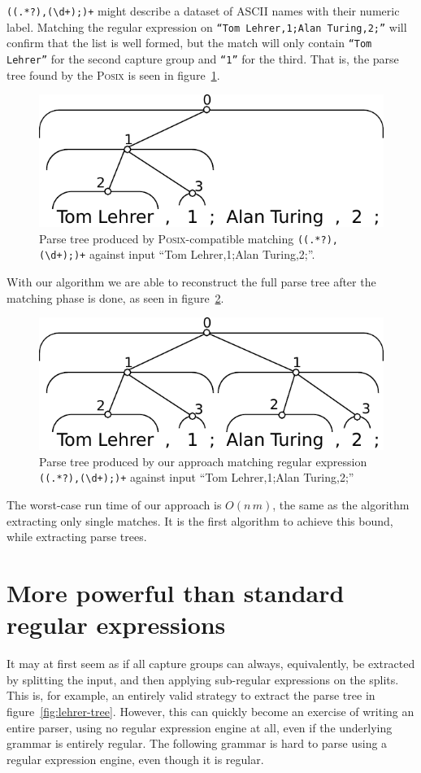 \documentclass[11pt]{Thesis}
\theoremstyle{definition}
\newcommand{\Figref}[1]{figure~\ref{fig:#1}}
\newcommand{\figlabel}[1]{\label{fig:#1}}
\newcommand{\seclabel}[1]{\label{sec:#1}}
\begin{document}
\texttt{((.*?),(\textbackslash d+);)+} might describe a dataset of ASCII names
with their numeric label. Matching the regular expression on \texttt{``Tom
Lehrer,1;Alan Turing,2;''} will confirm that the list is well formed, but the
match will only contain \texttt{``Tom Lehrer''} for the second capture group
and \texttt{``1''} for the third. That is, the parse tree found by the
\textsc{Posix} is seen in \Figref{posix}.

\begin{figure}[htp]
\centering
\includegraphics[width=.75\linewidth]{graphs/posix_parse}
\caption[Posix parse tree]{\figlabel{lehrer-posix} Parse tree produced by
\textsc{Posix}-compatible matching \texttt{((.*?),(\textbackslash d+);)+}
against input ``Tom Lehrer,1;Alan Turing,2;''.}
\figlabel{posix}
\end{figure}

With our algorithm we are able to reconstruct the full parse
tree after the matching phase is done, as seen in \Figref{our-tree}.

\begin{figure}[htp]
\centering
\includegraphics[width=.75\linewidth]{graphs/full_parse}
\caption[Full parse tree]{\figlabel{lehrer-tree} Parse tree produced by our approach matching
regular expression \texttt{((.*?),(\textbackslash d+);)+} against input ``Tom
Lehrer,1;Alan Turing,2;''}
\figlabel{our-tree}
\end{figure}

The worst-case run time of our approach is $O(n\,m)$, the same as the 
algorithm extracting only single matches. It is the first algorithm to achieve
this bound, while extracting parse trees.

\section{More powerful than standard regular expressions}
\seclabel{power}
It may at first seem as if all capture groups can always, equivalently,
be extracted by splitting the input, and then applying sub-regular
expressions on the splits.  This is, for example, an entirely valid
strategy to extract the parse tree in \Figref{lehrer-tree}.  However,
this can quickly become an exercise of writing an entire parser,
using no regular expression engine at all, even if the underlying
grammar is entirely regular.  The following grammar is hard to parse
using a regular expression engine, even though it is regular.
\end{document}
